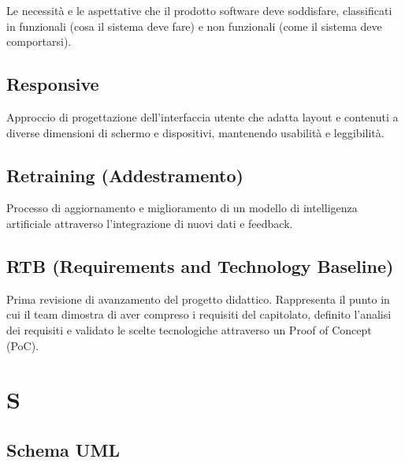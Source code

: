 \documentclass[a4paper, 11pt, oneside]{scrartcl} %
\begin{document}

Le necessità e le aspettative che il prodotto software deve soddisfare, classificati in funzionali (cosa il sistema deve fare) e non funzionali (come il sistema deve comportarsi).

\vspace{0.5cm}

\subsection*{Responsive}
Approccio di progettazione dell'interfaccia utente che adatta layout e contenuti a diverse dimensioni di schermo e dispositivi, mantenendo usabilità e leggibilità.
\vspace{0.5cm}

\subsection*{Retraining (Addestramento)}
Processo di aggiornamento e miglioramento di un modello di intelligenza artificiale attraverso l'integrazione di nuovi dati e feedback.
\vspace{0.5cm}

\subsection*{RTB (Requirements and Technology Baseline)}
Prima revisione di avanzamento del progetto didattico. Rappresenta il punto in cui il team dimostra di aver compreso i requisiti del capitolato, definito l'analisi dei requisiti e validato le scelte tecnologiche attraverso un Proof of Concept (PoC).
\vspace{0.5cm}



\section*{S}


\subsection*{Schema UML}

\end{document}
